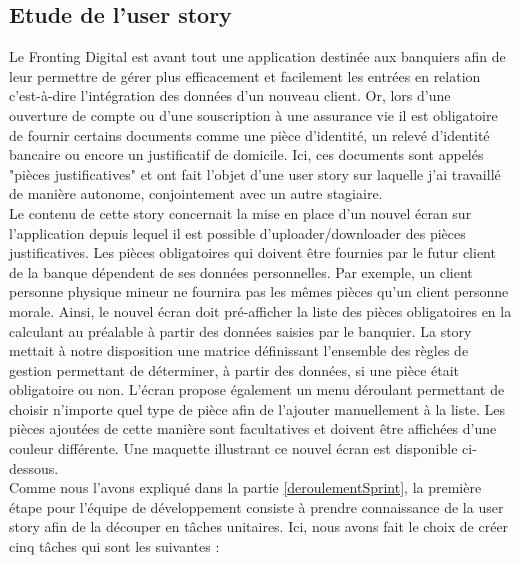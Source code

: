 \subsection{Etude de l'user story}

	Le Fronting Digital est avant tout une application destinée aux banquiers afin de leur permettre de gérer plus efficacement et facilement les entrées en relation c'est-à-dire l'intégration des données d'un nouveau client. Or, lors d'une ouverture de compte ou d'une souscription à une assurance vie il est obligatoire de fournir certains documents comme une pièce d'identité, un relevé d'identité bancaire ou encore un justificatif de domicile. Ici, ces documents sont appelés "pièces justificatives" et ont fait l'objet d'une user story sur laquelle j'ai travaillé de manière autonome, conjointement avec un autre stagiaire. \\
	
	Le contenu de cette story concernait la mise en place d'un nouvel écran sur l'application depuis lequel il est possible d'uploader/downloader des pièces justificatives. Les pièces obligatoires qui doivent être fournies par le futur client de la banque dépendent de ses données personnelles. Par exemple, un client personne physique mineur ne fournira pas les mêmes pièces qu'un client personne morale. Ainsi, le nouvel écran doit pré-afficher la liste des pièces obligatoires en la calculant au préalable à partir des données saisies par le banquier. La story mettait à notre disposition une matrice définissant l'ensemble des règles de gestion permettant de déterminer, à partir des données, si une pièce était obligatoire ou non. L'écran propose également un menu déroulant permettant de choisir n'importe quel type de pièce afin de l'ajouter manuellement à la liste. Les pièces ajoutées de cette manière sont facultatives et doivent être affichées d'une couleur différente. Une maquette illustrant ce nouvel écran est disponible ci-dessous. \\

	Comme nous l'avons expliqué dans la partie \ref{deroulementSprint}, la première étape pour l'équipe de développement consiste à prendre connaissance de la user story afin de la découper en tâches unitaires. Ici, nous avons fait le choix de créer cinq tâches qui sont les suivantes :
	

